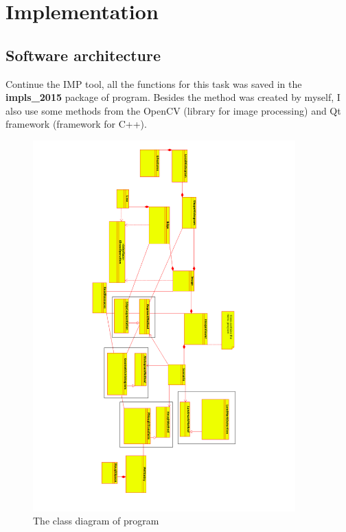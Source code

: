 \chapter{Implementation}
\section{Software architecture}
Continue the IMP tool, all the functions for this task was saved in the \textbf{impls\_2015} package of program. Besides the method was created by myself, I also use some methods from the OpenCV (library for image processing) and Qt framework (framework for C++).\\[0.2cm]
\begin{figure}[h!]
\centering
\includegraphics[width=0.9\textwidth]{images/cdiagram}
\caption{The class diagram of program}
\label{fig:cdiagram}
\end{figure}
